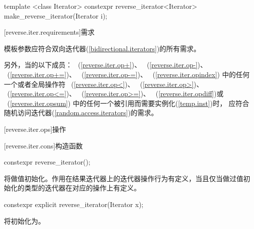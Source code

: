\begin{codeblock}
{  template <class Iterator>
    constexpr reverse_iterator<Iterator> make_reverse_iterator(Iterator i);      
}
\end{codeblock}

[reverse.iter.requirements]{需求}

\pnum
模板参数应符合双向迭代器(\ref{bidirectional.iterators})的所有需求。

\pnum
另外，当的以下成员：
~(\ref{reverse.iter.op+})、
~(\ref{reverse.iter.op-})、
~(\ref{reverse.iter.op+=})、
~(\ref{reverse.iter.op-=})、
~(\ref{reverse.iter.opindex})
中的任何一个或者全局操作符
~(\ref{reverse.iter.op<})、
~(\ref{reverse.iter.op>})、\\
~(\ref{reverse.iter.op<=})、
~(\ref{reverse.iter.op>=})、
~(\ref{reverse.iter.opdiff})或
~(\ref{reverse.iter.opsum})
中的任何一个被引用而需要实例化(\ref{temp.inst})时，
应符合随机访问迭代器(\ref{random.access.iterators})的需求。

[reverse.iter.ops]{操作}

[reverse.iter.cons]{构造函数}

%
\begin{itemdecl}
constexpr reverse_iterator();
\end{itemdecl}

\begin{itemdescr}
\pnum
\effects
将做值初始化。作用在结果迭代器上的迭代器操作行为有定义，当且仅当做过值初始化的类型的迭代器在对应的操作上有定义。
\end{itemdescr}

%

\begin{itemdecl}
constexpr explicit reverse_iterator(Iterator x);
\end{itemdecl}

\begin{itemdescr}
\pnum
\effects
将初始化为。
\end{itemdescr}

%

